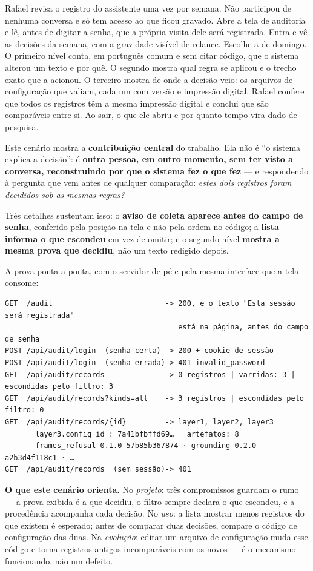 \documentclass[10pt]{article}
\begin{document}
Rafael revisa o registro do assistente uma vez por semana. Não participou de nenhuma conversa e só tem acesso ao que ficou gravado. Abre a tela de auditoria e lê, antes de digitar a senha, que a própria visita dele será registrada. Entra e vê as decisões da semana, com a gravidade visível de relance. Escolhe a de domingo. O primeiro nível conta, em português comum e sem citar código, que o sistema alterou um texto e por quê. O segundo mostra qual regra se aplicou e o trecho exato que a acionou. O terceiro mostra de onde a decisão veio: os arquivos de configuração que valiam, cada um com versão e impressão digital. Rafael confere que todos os registros têm a mesma impressão digital e conclui que são comparáveis entre si. Ao sair, o que ele abriu e por quanto tempo vira dado de pesquisa.

Este cenário mostra a \textbf{contribuição central} do trabalho. Ela não é ``o sistema explica a decisão'': é \textbf{outra pessoa, em outro momento, sem ter visto a conversa, reconstruindo por que o sistema fez o que fez} --- e respondendo à pergunta que vem antes de qualquer comparação: \emph{estes dois registros foram decididos sob as mesmas regras?}

Três detalhes sustentam isso: o \textbf{aviso de coleta aparece antes do campo de senha}, conferido pela posição na tela e não pela ordem no código; a \textbf{lista informa o que escondeu} em vez de omitir; e o segundo nível \textbf{mostra a mesma prova que decidiu}, não um texto redigido depois.

A prova ponta a ponta, com o servidor de pé e pela mesma interface que a tela consome:

\begin{lstlisting}
GET  /audit                          -> 200, e o texto "Esta sessão será registrada"
                                        está na página, antes do campo de senha
POST /api/audit/login  (senha certa) -> 200 + cookie de sessão
POST /api/audit/login  (senha errada)-> 401 invalid_password
GET  /api/audit/records              -> 0 registros | varridas: 3 | escondidas pelo filtro: 3
GET  /api/audit/records?kinds=all    -> 3 registros | escondidas pelo filtro: 0
GET  /api/audit/records/{id}         -> layer1, layer2, layer3
       layer3.config_id : 7a41bfbffd69…   artefatos: 8
       frames_refusal 0.1.0 57b85b367874 · grounding 0.2.0 a2b3d4f118c1 · …
GET  /api/audit/records  (sem sessão)-> 401
\end{lstlisting}

\textbf{O que este cenário orienta.} No \emph{projeto}: três compromissos guardam o rumo --- a prova exibida é a que decidiu, o filtro sempre declara o que escondeu, e a procedência acompanha cada decisão. No \emph{uso}: a lista mostrar menos registros do que existem é esperado; antes de comparar duas decisões, compare o código de configuração das duas. Na \emph{evolução}: editar um arquivo de configuração muda esse código e torna registros antigos incomparáveis com os novos --- é o mecanismo funcionando, não um defeito.
\end{document}
